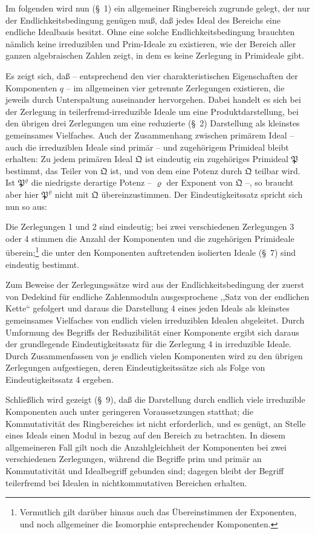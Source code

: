 \documentclass[11pt]{article}
\newcommand{\ideal}[1]{\mathfrak{#1}}
\begin{document}
Im folgenden wird nun (\S~1) ein allgemeiner Ringbereich zugrunde gelegt, der nur der Endlichkeitsbedingung genügen muß, daß jedes Ideal des Bereichs eine endliche Idealbasis besitzt. Ohne eine solche Endlichkeitsbedingung brauchten nämlich keine irreduziblen und Prim-Ideale zu existieren, wie der Bereich aller ganzen algebraischen Zahlen zeigt, in dem es keine Zerlegung in Primideale gibt.

Es zeigt sich, daß -- entsprechend den vier charakteristischen Eigenschaften der Komponenten $q$ -- im allgemeinen vier getrennte Zerlegungen existieren, die jeweils durch Unterspaltung auseinander hervorgehen. Dabei handelt es sich bei der Zerlegung in teilerfremd-irreduzible Ideale um eine Produktdarstellung, bei den übrigen drei Zerlegungen um eine reduzierte (\S~2) Darstellung als kleinstes gemeinsames Vielfaches. Auch der Zusammenhang zwischen primärem Ideal -- auch die irreduziblen Ideale sind primär -- und zugehörigem Primideal bleibt erhalten: Zu jedem primären Ideal $\ideal Q$ ist eindeutig ein zugehöriges Primideal $\ideal P$ bestimmt, das Teiler von $\ideal Q$ ist, und von dem eine Potenz durch $\ideal Q$ teilbar wird. Ist $\ideal P^\varrho$ die niedrigste derartige Potenz -- $\varrho$ der Exponent von $\ideal Q$ --, so braucht aber hier $\ideal P^\varrho$ nicht mit $\ideal Q$ übereinzustimmen. Der Eindeutigkeitssatz spricht sich nun so aus:

Die Zerlegungen 1 und 2 sind eindeutig; bei zwei verschiedenen Zerlegungen 3 oder 4 stimmen die Anzahl der Komponenten und die zugehörigen Primideale überein;\footnote{Vermutlich gilt darüber hinaus auch das Übereinstimmen der Exponenten, und noch allgemeiner die Isomorphie entsprechender Komponenten.} die unter den Komponenten auftretenden isolierten Ideale (\S~7) sind eindeutig bestimmt.

Zum Beweise der Zerlegungssätze wird aus der Endlichkeitsbedingung der zuerst von Dedekind für endliche Zahlenmoduln ausgesprochene ,,Satz von der endlichen Kette`` gefolgert und daraus die Darstellung 4 eines jeden Ideals als kleinstes gemeinsames Vielfaches von endlich vielen irreduziblen Idealen abgeleitet. Durch Umformung des Begriffs der Reduzibilität einer Komponente ergibt sich daraus der grundlegende Eindeutigkeitssatz für die Zerlegung 4 in irreduzible Ideale. Durch Zusammenfassen von je endlich vielen Komponenten wird zu den übrigen Zerlegungen aufgestiegen, deren Eindeutigkeitssätze sich als Folge von Eindeutigkeitssatz 4 ergeben.

Schließlich wird gezeigt (\S~9), daß die Darstellung durch endlich viele irreduzible Komponenten auch unter geringeren Voraussetzungen statthat; die Kommutativität des Ringbereiches ist nicht erforderlich, und es genügt, an Stelle eines Ideals einen Modul in bezug auf den Bereich zu betrachten. In diesem allgemeineren Fall gilt noch die Anzahlgleichheit der Komponenten bei zwei verschiedenen Zerlegungen, während die Begriffe prim und primär an Kommutativität und Idealbegriff gebunden sind; dagegen bleibt der Begriff teilerfremd bei Idealen in nichtkommutativen Bereichen erhalten.
\end{document}
